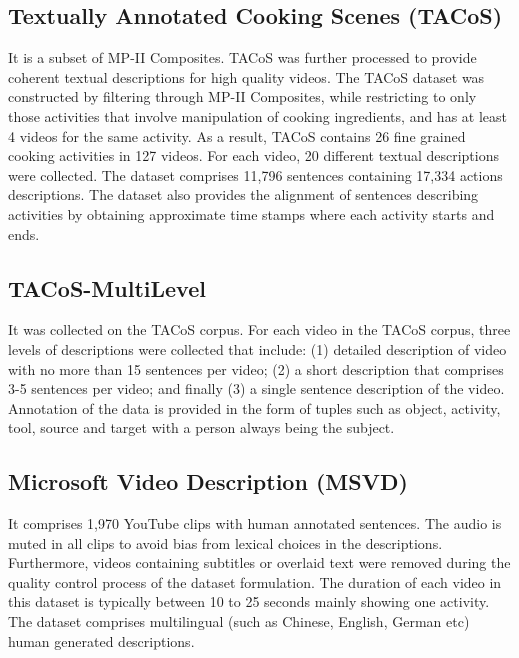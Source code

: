 \subsection{Textually Annotated Cooking Scenes (TACoS)}

\par It is a subset of MP-II Composites. TACoS was further processed to provide coherent textual descriptions for high quality videos. The TACoS dataset was constructed by filtering through MP-II Composites, while restricting to only those activities that involve manipulation of cooking ingredients, and has at least 4 videos for the same activity. As a result, TACoS contains 26 fine grained cooking activities in 127 videos. For each video, 20 different textual descriptions were collected. The dataset comprises 11,796 sentences containing 17,334 actions descriptions. The dataset also provides the alignment of sentences describing activities by obtaining approximate time stamps where each activity starts and ends.

\subsection{TACoS-MultiLevel}

\par It was collected on the TACoS corpus. For each video in the TACoS corpus, three levels of descriptions were collected that include: (1) detailed description of video with no more than 15 sentences per video; (2) a short description that comprises 3-5 sentences per video; and finally (3) a single sentence description of the video. Annotation of the data is provided in the form of tuples such as object, activity, tool, source and target with a person always being the subject.


\subsection{Microsoft Video Description (MSVD)}

\par It comprises 1,970 YouTube clips with human annotated sentences. The audio is muted in all clips to avoid bias from lexical choices in the descriptions. Furthermore, videos containing subtitles or overlaid text were removed during the quality control process of the dataset formulation. The duration of each video in this dataset is typically between 10 to 25 seconds mainly showing one activity. The dataset comprises multilingual (such as Chinese, English, German etc) human generated descriptions.


